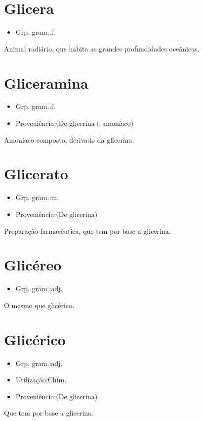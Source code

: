\section{Glicera}
\begin{itemize}
\item {Grp. gram.:f.}
\end{itemize}
Animal radiário, que habita as grandes profundidades oceânicas.
\section{Gliceramina}
\begin{itemize}
\item {Grp. gram.:f.}
\end{itemize}
\begin{itemize}
\item {Proveniência:(De \textunderscore glicerina\textunderscore  + \textunderscore amoníaco\textunderscore )}
\end{itemize}
Amoníaco composto, derivado da glicerina.
\section{Glicerato}
\begin{itemize}
\item {Grp. gram.:m.}
\end{itemize}
\begin{itemize}
\item {Proveniência:(De \textunderscore glicerina\textunderscore )}
\end{itemize}
Preparação farmacêutica, que tem por base a glicerina.
\section{Glicéreo}
\begin{itemize}
\item {Grp. gram.:adj.}
\end{itemize}
O mesmo que \textunderscore glicérico\textunderscore .
\section{Glicérico}
\begin{itemize}
\item {Grp. gram.:adj.}
\end{itemize}
\begin{itemize}
\item {Utilização:Chím.}
\end{itemize}
\begin{itemize}
\item {Proveniência:(De \textunderscore glicerina\textunderscore )}
\end{itemize}
Que tem por base a glicerina.
